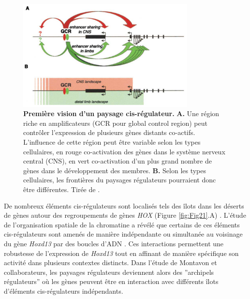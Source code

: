 \begin{figure}[h]
 \centering
 \includegraphics[width=0.8\textwidth, page=1] {figures/introduction/fig20.png}
 \caption[Première vision d'un paysage \gls{cis}-régulateur.]{
 \textbf{Première vision d'un paysage \gls{cis}-régulateur.}
 \textbf{A.} Une région riche en \glspl{amplificateur} (GCR pour global control region) peut contrôler l'expression de plusieurs gènes distants co-actifs. L'influence de cette région peut être variable selon les types cellulaires, en rouge co-activation des gènes dans le système nerveux central (CNS), en vert co-activation d'un plus grand nombre de gènes dans le développement des membres. \textbf{B.} Selon les types cellulaires, les frontières du paysages régulateurs pourraient donc être différentes. Tirée de \citet{spitz_global_2003}.\\
 }
 \label{fig:Fig20}
\end{figure}

De nombreux éléments \gls{cis}-régulateurs sont localisés tels des îlots dans les déserts de gènes autour des regroupements de gènes \textit{HOX} (Figure \ref{fig:Fig21}.A) \citep{montavon_regulatory_2011}. L’étude de l’organisation spatiale de la chromatine a révélé que certains de ces éléments \gls{cis}-régulateurs sont amenés de manière indépendante ou simultanée au voisinage du gène \textit{Hoxd13} par des boucles d’ADN \citep{montavon_regulatory_2011}. Ces interactions permettent une robustesse de l’expression de \textit{Hoxd13} tout en affinant de manière spécifique son activité dans plusieurs contextes distincts. Dans l'étude de Montavon et collaborateurs, les paysages régulateurs deviennent alors des ”archipels régulateurs” où les gènes peuvent être en interaction avec différents îlots  d’éléments \gls{cis}-régulateurs indépendants. \\

